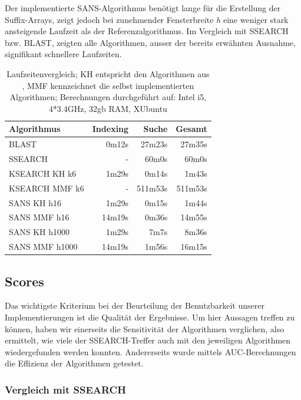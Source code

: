 \documentclass{article}
\begin{document}
Der implementierte SANS-Algorithmus benötigt lange für die Erstellung der Suffix-Arrays, zeigt jedoch bei zunehmender Fensterbreite \textit h 
eine weniger stark ansteigende Laufzeit als der Referenzalgorithmus.  Im Vergleich mit SSEARCH bzw. BLAST,  zeigten alle Algorithmen, ausser der bereits erwähnten Ausnahme, signifikant schnellere Laufzeiten.
  \begin{table}[h]
    \caption{Laufzeitenvergleich; KH entspricht den Algorithmen aus \cite{Holm}, MMF kennzeichnet die selbst implementierten Algorithmen; Berechnungen durchgeführt auf: Intel i5, 4*3.4GHz, 32gb RAM, XUbuntu}
    \begin{center}
    \begin{tabular}{lrrr}
    \hline
    Algorithmus & Indexing & Suche & Gesamt\\
    \hline
    BLAST & 0m12s & 27m23s & 27m35s\\
    SSEARCH & - & 60m0s & 60m0s\\
    KSEARCH KH k6 & 1m29s & 0m14s & 1m43s\\
    KSEARCH MMF k6 & -  & 511m53s & 511m53s\\
    SANS KH h16 & 1m29s &  0m15s & 1m44s\\
    SANS MMF  h16 & 14m19s & 0m36s & 14m55s\\
    SANS KH h1000 & 1m29s & 7m7s & 8m36s\\
    SANS MMF  h1000 & 14m19s & 1m56s & 16m15s\\
    \hline
    \end{tabular}
    \label{runtimes}
    \end{center}
  \end{table}

\subsection{Scores}

Das wichtigste Kriterium bei der Beurteilung der Benutzbarkeit unserer Implementierungen ist die Qualität der Ergebnisse. Um hier Aussagen treffen
zu können, haben wir einerseits die Sensitivität der Algorithmen verglichen, also ermittelt, wie viele der SSEARCH-Treffer auch mit den jeweiligen Algorithmen wiedergefunden werden konnten. Andererseits wurde mittels AUC-Berechnungen die Effizienz der Algorithmen getestet.

\subsubsection{Vergleich mit SSEARCH}
\end{document}
